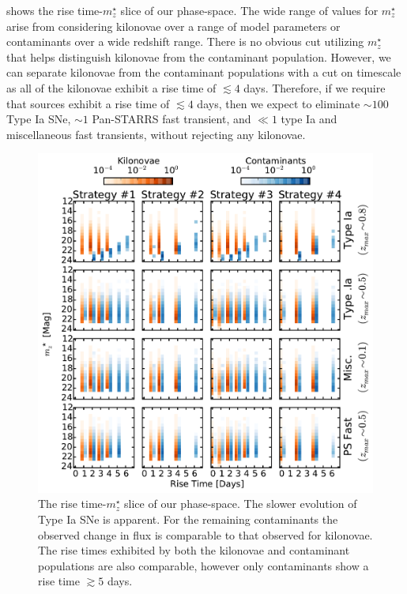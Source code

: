  shows the rise time-$m^{\star}_z$ slice of our phase-space. The wide range of values for $m^{\star}_z$ arise from considering kilonovae over a range of model parameters or contaminants over a wide redshift range. There is no obvious cut utilizing $m^{\star}_z$ that helps distinguish kilonovae from the contaminant population. However, we can separate kilonovae from the contaminant populations with a cut on timescale as all of the kilonovae exhibit a rise time of $\lesssim 4$ days. Therefore, if we require that sources exhibit a rise time of $\lesssim 4$ days, then we expect to eliminate $\sim 100$ Type Ia SNe, $\sim 1$ Pan-STARRS fast transient, and $\ll1$ type Ia and miscellaneous fast transients, without rejecting any kilonovae.

\begin{figure}[t!]
\centering
\includegraphics[width=\textwidth]{./figs/chapter2/ch2_f15.pdf}
\caption{The rise time-$m^{\star}_z$ slice of our phase-space. The slower evolution of Type Ia SNe is apparent. For the remaining contaminants the observed change in flux is comparable to that observed for kilonovae. The rise times exhibited by both the kilonovae and contaminant populations are also comparable, however only contaminants show a rise time $\gtrsim 5$ days.}
\label{fig:ch2_phaserisediff_df}
\end{figure}

